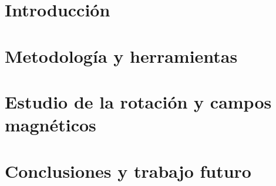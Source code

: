 \documentclass[print, color]{ugrTFG}
\begin{document}
\maketitle


\frontmatter %

   
            


                    
               

\mainmatter %

\part{Introducción} %



%

\cleardoublepage
\part{Metodología y herramientas}




\cleardoublepage
\part{Estudio de la rotación y campos magnéticos} \label{parte1}


%


\cleardoublepage
\part{Conclusiones y trabajo futuro}



\appendix %
\end{document}
